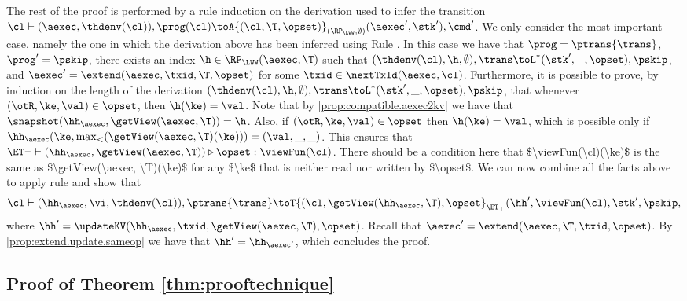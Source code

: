 The rest of the proof is performed by a rule induction on the derivation used to infer 
the transition $\cl \vdash (\aexec, \thdenv(\cl)), \prog(\cl) \toA{(\cl, \T, \opset)}_{(\RP_{\LWW}, \emptyset)} (\aexec', \stk'), \cmd'$. 
We only consider the most important case, namely the one in which the derivation above 
has been inferred using Rule . In this case we have that 
$\prog = \ptrans{\trans}$, $\prog' = \pskip$, there exists an index $\h \in \RP_{\LWW}(\aexec, \T)$ such that 
$(\thdenv(\cl), \h, \emptyset), \trans \toL^{\ast} (\stk', \_, \opset), \pskip$, and $\aexec' = 
\extend(\aexec, \txid, \T, \opset)$ for some $\txid \in \nextTxId(\aexec, \cl)$. 
Furthermore, it is possible to prove, by induction on the length of the derivation $(\thdenv(\cl), \h, \emptyset), \trans \toL^{\ast} (\stk', \_, \opset), \pskip$, 
that whenever $(\otR, \ke, \val) \in \opset$, then $\h(\ke) = \val$.
Note that by \cref{prop:compatible.aexec2kv} we have that $\snapshot(\hh_{\aexec}, \getView(\aexec, \T)) = 
\h$. Also, if $(\otR,\ke, \val) \in \opset$ then $\h(\ke) = \val$, which is possible only if  
$\hh_{\aexec}(\ke, \max_{<}(\getView(\aexec, \T)(\ke))) = (\val, \_, \_)$. This ensures 
that $\ET_{\top} \vdash (\hh_{\aexec}, \getView(\aexec, \T)) \triangleright \opset: \viewFun(\cl)$. 
\ac{There should be a condition here that $\viewFun(\cl)(\ke)$ is the same as $\getView(\aexec, \T)(\ke)$ 
for any $\ke$ that is neither read nor written by $\opset$.} 
We can now combine all the facts above to apply rule  and show that 
\[
\cl \vdash (\hh_{\aexec}, \vi, \thdenv(\cl)), \ptrans{\trans} \toT{(\cl, \getView(\hh_{\aexec}, \T), \opset}_{\ET_{\top}} 
(\hh', \viewFun(\cl), \stk', \pskip, 
\] 
where $\hh' = \updateKV(\hh_{\aexec}, \txid, \getView(\aexec, \T), \opset)$. 
Recall that $\aexec' = \extend(\aexec, \T, \txid, \opset)$. 
By \cref{prop:extend.update.sameop} we have that $\hh' = \hh_{\aexec'}$, 
which concludes the proof.

\subsection{Proof of Theorem \ref{thm:prooftechnique}}
